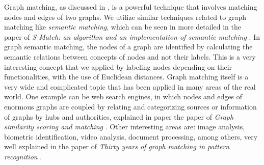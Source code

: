 %
Graph matching, as discussed in , is a powerful technique that involves matching nodes and edges of two graphs. We utilize similar techniques related to graph matching like \textit{semantic matching}, which can be seen in more detailed in the paper of \textit{S-Match: an algorithm and an implementation of semantic matching} \cite{graphSemanticMatching}. In graph semantic matching, the nodes of a graph are identified by calculating the semantic relations between concepts of nodes and not their labels. This is a very interesting concept that we applied by labeling nodes depending on their functionalities, with the use of Euclidean distances. 
%
Graph matching itself is a very wide and complicated topic that has been applied in many areas of the real world. One example can be web search engines, in which nodes and edges of enormous graphs are coupled by relating and categorizing sources or information of graphs by hubs and authorities, explained in paper the paper of \textit{Graph similarity scoring and matching} \cite{graphSimilarityScoringMatching}. Other interesting areas are: image analysis, biometric identification, video analysis, document processing, among others, very well explained in the paper of \textit{Thirty years of graph matching in pattern recognition} \cite{patternRecognition}. 
%

